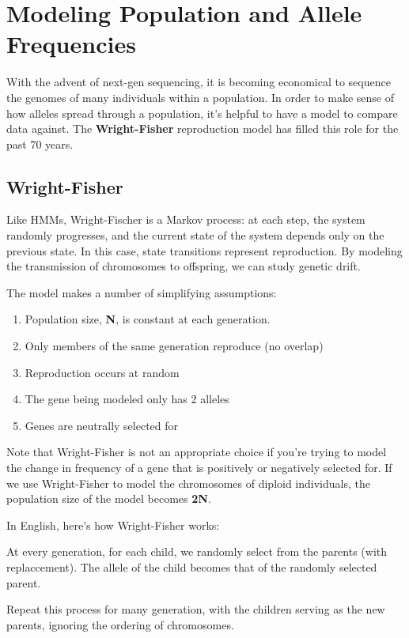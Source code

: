 \section{Modeling Population and Allele Frequencies}
With the advent of next-gen sequencing, it is becoming economical to
sequence the genomes of many individuals within a population. In order
to make sense of how alleles spread through a population, it's helpful
to have a model to compare data against. The \textbf{Wright-Fisher} 
reproduction model has filled this role for the past 70 years.

\subsection{Wright-Fisher}

Like HMMs, Wright-Fischer is a Markov process: at each step, the system
randomly progresses, and the current state of the system depends only 
on the previous state. In this case, state transitions represent reproduction.
By modeling the transmission of chromosomes to offspring, we can study genetic drift.

The model makes a number of simplifying assumptions:
\begin{enumerate}
\item Population size, \textbf{N}, is constant at each generation.
\item Only members of the same generation reproduce (no overlap)
\item Reproduction occurs at random
\item The gene being modeled only has 2 alleles
\item Genes are neutrally selected for
\end{enumerate}

Note that Wright-Fisher is not an appropriate choice if you're trying to
model the change in frequency of a gene that is positively or negatively
selected for. If we use Wright-Fisher to model the chromosomes of diploid
individuals, the population size of the model becomes \textbf{2N}.


In English, here's how Wright-Fisher works:

At every generation, for each child, we randomly select from the parents (with replaccement). The allele of the child becomes that of the randomly selected parent.

Repeat this process for many generation, with the children serving as the new parents, ignoring the ordering of chromosomes.


